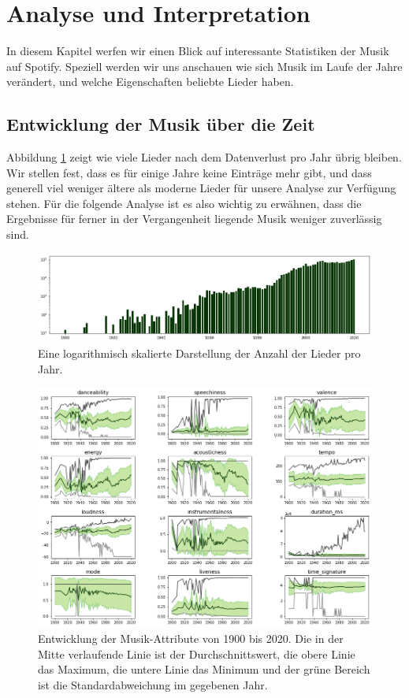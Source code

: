 \documentclass[conference]{IEEEtran}
\begin{document}
\section{Analyse und Interpretation}
In diesem Kapitel werfen wir einen Blick auf interessante Statistiken der Musik auf Spotify. Speziell werden wir uns anschauen wie sich Musik im Laufe der Jahre verändert, und welche Eigenschaften beliebte Lieder haben.
\subsection{Entwicklung der Musik über die Zeit}
Abbildung \ref{songs_per_year} zeigt wie viele Lieder nach dem Datenverlust pro Jahr übrig bleiben. Wir stellen fest, dass es für einige Jahre keine Einträge mehr gibt, und dass generell viel weniger ältere als moderne Lieder für unsere Analyse zur Verfügung stehen. Für die folgende Analyse ist es also wichtig zu erwähnen, dass die Ergebnisse für ferner in der Vergangenheit liegende Musik weniger zuverlässig sind.
\begin{figure}[t]
\centering
\includegraphics[width=\textwidth]{images/songs_per_year.png}
\caption{Eine logarithmisch skalierte Darstellung der Anzahl der Lieder pro Jahr.}
\label{songs_per_year}
\end{figure}
\begin{figure}[t]
\centering
\includegraphics[width=\textwidth]{images/over_time.png}
\caption{Entwicklung der Musik-Attribute von 1900 bis 2020. Die in der Mitte verlaufende Linie ist der Durchschnittswert, die obere Linie das Maximum, die untere Linie das Minimum und der grüne Bereich ist die Standardabweichung im gegebenen Jahr.}
\label{time}
\end{figure}
\end{document}

